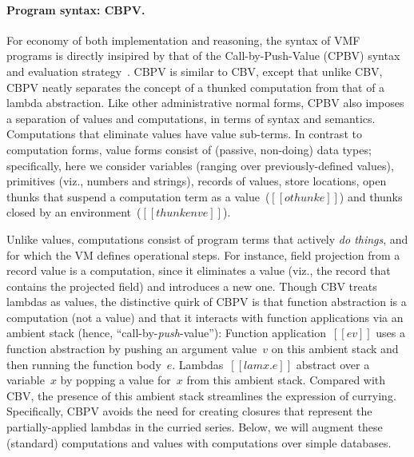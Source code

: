 \paragraph{Program syntax: CBPV.}
For economy of both implementation and reasoning, the syntax of VMF
programs is directly insipired by that of the Call-by-Push-Value
(CPBV) syntax and evaluation strategy~\cite{CBPV}.
%
CBPV is similar to CBV, except that unlike CBV, CBPV neatly separates
the concept of a thunked computation from that of a lambda
abstraction.
%
Like other administrative normal forms, CPBV also imposes a separation
of values and computations, in terms of syntax and semantics.
%
Computations that eliminate values have value sub-terms.
%
In contrast to computation forms, value forms consist of (passive,
non-doing) data types; specifically, here we consider variables
(ranging over previously-defined values), primitives (viz., numbers
and strings), records of values, store locations, open thunks that
suspend a computation term as a value~($[[othunk e]]$) and thunks
closed by an environment~($[[thunk env e]]$).

Unlike values, computations consist of program terms that actively
\emph{do things}, and for which the VM defines operational steps. For
instance, field projection from a record value is a computation, since
it eliminates a value (viz., the record that contains the projected
field) and introduces a new one.
%
Though CBV treats lambdas as values, the distinctive quirk of CBPV is
that function abstraction is a computation (not a value) and that it
interacts with function applications via an ambient stack (hence,
``call-by-\emph{push}-value''):
%
Function application~$[[e v]]$ uses a function abstraction by pushing
an argument value~$v$ on this ambient stack and then running the
function body~$e$.
%
Lambdas~$[[lam x.e]]$ abstract over a variable~$x$ by popping a value
for~$x$ from this ambient stack.
%
Compared with CBV, the presence of this ambient stack streamlines the
expression of currying.
%
Specifically, CBPV avoids the need for creating closures that
represent the partially-applied lambdas in the curried series.
%
Below, we will augment these (standard) computations and values with
computations over simple databases.

